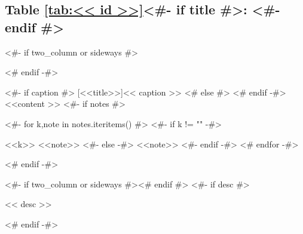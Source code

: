 \subsection{Table \ref{tab:<< id >>}<#- if title #>: <#- endif #>\hfill%
  \color{light-gray}}
<#- if two_column or sideways #>
\begin{adjustbox}{width=\textwidth,center}
<# endif -#>
\begin{threeparttable}
  <#- if caption #>
  [<<title>>]{<< caption >>}
  <# else #>
  <# endif -#>\label{tab:<< id >>}
  <<content >>
  <#- if notes #>
  \begin{tablenotes}
    <#- for k,note in notes.iteritems() #>
    <#- if k != "" -#>
    \item [<<k>>] <<note>>
    <#- else -#>
    <<note>>
    <#- endif -#>
    <# endfor -#>
  \end{tablenotes}
  <# endif -#>
\end{threeparttable}
<#- if two_column or sideways #>\end{adjustbox}<# endif #>
<#- if desc #>
\nopagebreak
\begin{figinfo}<< desc >>\end{figinfo}
<# endif -#>
\vspace{20pt}

